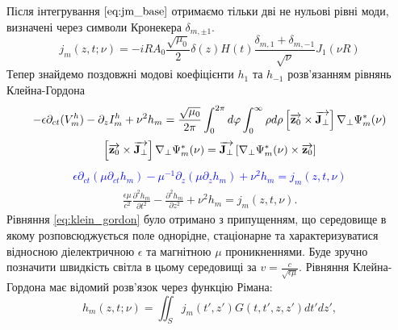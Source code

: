%
Після інтегрування $ \eqref{eq:jm_base} $ отримаємо тільки дві не нульові 
рівні моди, визначені через символи Кронекера $ \delta_{m,\pm1} $.
%
\begin{equation} 
j_m (z, t; \nu) = - i R A_0 \frac{\sqrt{\mu_0}}{2} \delta(z) H(t) 
\frac{\delta_{m,1} + \delta_{m,-1}}{\sqrt{\nu}} J_1 (\nu R)
\end{equation}
%
Тепер знайдемо поздовжні модові коефіцієнти $ h_1 $ та $ h_{-1} $ 
розв'язанням рівнянь Клейна-Гордона
%
\textcolor{blue} { \begin{equation*} \begin{aligned}
- \epsilon \partial_{ct} (V_m^h) - \partial_z I_m^h + \nu^2 h_m = 
\frac{\sqrt{\mu_0}}{2 \pi} \int_0^{2\pi} d \varphi 
\int_0^{\infty} \rho d \rho \left[ \overrightarrow{\mathbf z_0} \times \overrightarrow{\mathbf J_\perp} \right]
\nabla_\perp \Psi_m^* (\nu) 
\end{aligned} \end{equation*} }
%
\textcolor{blue} { \begin{equation*} \begin{aligned}
\left[ \overrightarrow{\mathbf z_0} \times \overrightarrow{\mathbf J_\perp} \right] \nabla_\perp \Psi_m^* (\nu) =
\overrightarrow{\mathbf J_\perp} \left[ \nabla_\perp \Psi_m^* (\nu) \times \overrightarrow{\mathbf z_0} \right]
\end{aligned} \end{equation*} }
%
\textcolor{blue} { \begin{equation*} \begin{aligned}
\epsilon \partial_{ct} \left( \mu \partial_{ct} h_m \right) -
\mu^{-1} \partial_z \left( \mu  \partial_z h_m \right) + 
\nu^2 h_m = j_m (z,t,\nu)
\end{aligned} \end{equation*} }
%
\begin{equation} \begin{aligned} \label{eq:klein_gordon}
\frac{\epsilon \mu}{c^2} \frac{\partial^2 h_m}{\partial t^2} - 
\frac{\partial^2 h_m}{\partial z^2} + \nu^2 h_m = j_m (z,t,\nu).
\end{aligned} \end{equation}
%
Рівняння \eqref{eq:klein_gordon} було отримано з припущенням, що середовище 
в якому розповсюджується поле однорідне, стаціонарне та характеризуватися 
відносною діелектричною $ \epsilon $ та магнітною $ \mu $ проникненнями.
Буде зручно позначити швидкість світла в цьому середовищі за 
$ \mathit{v} = \frac{c}{\sqrt{\epsilon \mu}} $. Рівняння Клейна-Гордона
має відомий розв'язок через функцію Рімана:
%
\begin{equation} \label{eq:klein_gordon_sol}
h_m (z, t; \nu) = \iint_S j_m (t',z') G(t,t',z,z') dt' dz',
\end{equation}
